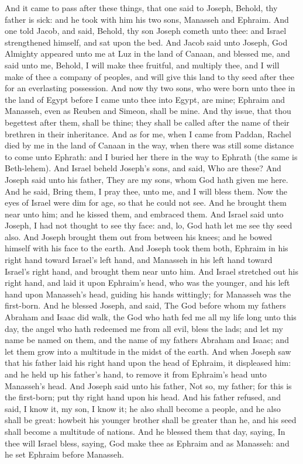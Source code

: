 And it came to pass after these things, that one said to Joseph, Behold, thy father is sick: and he took with him his two sons, Manasseh and Ephraim. And one told Jacob, and said, Behold, thy son Joseph cometh unto thee: and Israel strengthened himself, and sat upon the bed. And Jacob said unto Joseph, God Almighty appeared unto me at Luz in the land of Canaan, and blessed me, and said unto me, Behold, I will make thee fruitful, and multiply thee, and I will make of thee a company of peoples, and will give this land to thy seed after thee for an everlasting possession. And now thy two sons, who were born unto thee in the land of Egypt before I came unto thee into Egypt, are mine; Ephraim and Manasseh, even as Reuben and Simeon, shall be mine. And thy issue, that thou begettest after them, shall be thine; they shall be called after the name of their brethren in their inheritance. And as for me, when I came from Paddan, Rachel died by me in the land of Canaan in the way, when there was still some distance to come unto Ephrath: and I buried her there in the way to Ephrath (the same is Beth-lehem).  And Israel beheld Joseph’s sons, and said, Who are these? And Joseph said unto his father, They are my sons, whom God hath given me here. And he said, Bring them, I pray thee, unto me, and I will bless them. Now the eyes of Israel were dim for age, so that he could not see. And he brought them near unto him; and he kissed them, and embraced them. And Israel said unto Joseph, I had not thought to see thy face: and, lo, God hath let me see thy seed also. And Joseph brought them out from between his knees; and he bowed himself with his face to the earth. And Joseph took them both, Ephraim in his right hand toward Israel’s left hand, and Manasseh in his left hand toward Israel’s right hand, and brought them near unto him. And Israel stretched out his right hand, and laid it upon Ephraim’s head, who was the younger, and his left hand upon Manasseh’s head, guiding his hands wittingly; for Manasseh was the first-born. And he blessed Joseph, and said, The God before whom my fathers Abraham and Isaac did walk, the God who hath fed me all my life long unto this day, the angel who hath redeemed me from all evil, bless the lads; and let my name be named on them, and the name of my fathers Abraham and Isaac; and let them grow into a multitude in the midst of the earth. And when Joseph saw that his father laid his right hand upon the head of Ephraim, it displeased him: and he held up his father’s hand, to remove it from Ephraim’s head unto Manasseh’s head. And Joseph said unto his father, Not so, my father; for this is the first-born; put thy right hand upon his head. And his father refused, and said, I know it, my son, I know it; he also shall become a people, and he also shall be great: howbeit his younger brother shall be greater than he, and his seed shall become a multitude of nations. And he blessed them that day, saying, In thee will Israel bless, saying, God make thee as Ephraim and as Manasseh: and he set Ephraim before Manasseh. 